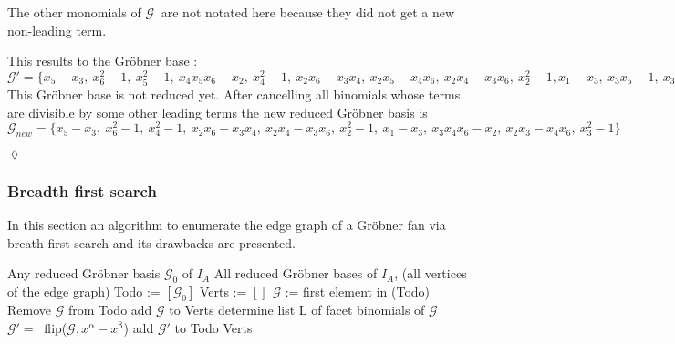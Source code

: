 \begin{env_example}
The other monomials of $\mathcal{G}~$ are not notated here because they did not get a new non-leading term.

This results to the Gröbner base : \\
$\mathcal{G}' = \{x_{5}-x_{3},~x_{6}^{2}-1,~x_{5}^{2}-1,~x_{4}x_{5}x_{6}-x_{2},~x_{4}^{2}-1,~ x_{2}x_{6}-x_{3}x_{4},~x_{2}x_{5}-x_{4}x_{6},~x_{2}x_{4}-x_{3}x_{6} ,~x_{2}^{2}-1,x_{1}-x_{3},~x_{3}x_{5}-1,~x_{3}x_{4}x_{6}-x_{2},~x_{2}x_{3}-x_{4}x_{6},~x_{3}^{2}-1 \}$ \\
This Gröbner base is not reduced yet. After cancelling all binomials whose terms are divisible by some other leading terms the new reduced Gröbner basis is 
$\mathcal{G}_{new} = \{x_{5}-x_{3},~x_{6}^{2}-1,~x_{4}^{2}-1,~x_{2}x_{6}-x_{3}x_{4},~x_{2}x_{4}-x_{3}x_{6},~x_{2}^{2}-1,~x_{1}-x_{3},~x_{3}x_{4}x_{6}-x_{2},~x_{2}x_{3}-x_{4}x_{6},~x_{3}^{2}-1 \} $

\begin{flushright}
$\lozenge$
\end{flushright}
\end{env_example}


\subsubsection{Breadth first search}

In this section an algorithm to enumerate the edge graph of a Gröbner fan via breath-first search and its drawbacks are presented.

\begin{algorithm}
\caption{Enumerating the edge graph of the Gröbner fan via breath-first search \cite{tigers}}
\label{alg:breath}
\begin{algorithmic}[1]

\Input
Any reduced Gröbner basis $ \mathcal{G}_0 $ of $I_A$
\Output All reduced Gröbner bases of $I_A$, (all vertices of the edge graph)
\State Todo := $\left[ \mathcal{G}_0 \right]  $
\State Verts := $\left[ \right] $
\State $\mathcal{G}$ := first element in (Todo)
\State Remove $\mathcal{G} $ from Todo
\State add $\mathcal{G}$ to Verts 
\State determine list L of facet binomials of $\mathcal{G} $
 \State $\mathcal{G}' =~$ flip($\mathcal{G},x^{\upalpha} - x^{\upbeta} $)
 \State add $\mathcal{G}'$ to Todo
 \EndIf
 \EndFor
\EndWhile 
\Return Verts

\end{algorithmic}
\end{algorithm}

